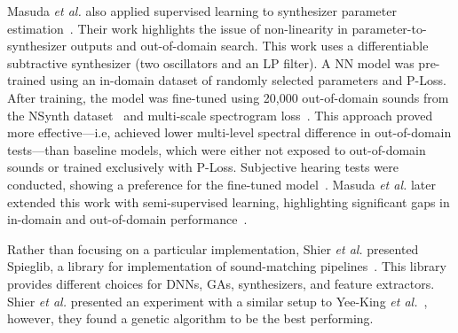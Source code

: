 \documentclass[lettersize,journal]{IEEEtran}
\begin{document}
Masuda \textit{et al.} also applied supervised learning to synthesizer parameter estimation~\cite{masuda2021soundmatch}. Their work highlights the issue of non-linearity in parameter-to-synthesizer outputs and out-of-domain search. This work uses a differentiable subtractive synthesizer (two oscillators and an LP filter). A NN model was pre-trained using an in-domain dataset of randomly selected parameters and P-Loss. After training, the model was fine-tuned using 20,000 out-of-domain sounds from the NSynth dataset~\cite{engel2017neural} and multi-scale spectrogram loss~\cite{engel2020ddsp}. This approach proved more effective---i.e, achieved lower multi-level spectral difference in out-of-domain tests---than baseline models, which were either not exposed to out-of-domain sounds or trained exclusively with P-Loss. Subjective hearing tests were conducted, showing a preference for the fine-tuned model~\cite{masuda2021soundmatch}. Masuda \textit{et al.} later extended this work with semi-supervised learning, highlighting significant gaps in in-domain and out-of-domain performance~\cite{masuda2023improving}.

Rather than focusing on a particular implementation, Shier \textit{et al.} presented Spieglib, a library for implementation of sound-matching pipelines~\cite{shier2020spiegelib}. This library provides different choices for DNNs, GAs, synthesizers, and feature extractors. Shier \textit{et al.} presented an experiment with a similar setup to Yee-King \textit{et al.}~\cite{yee2018automatic}, however, they found a genetic algorithm to be the best performing.

\end{document}
